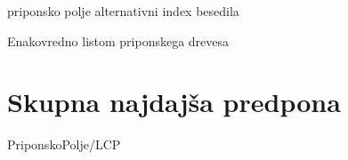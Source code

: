 priponsko polje alternativni index besedila

Enakovredno listom priponskega drevesa

\section{Skupna najdajša predpona}\label{sec:LCP}
{PriponskoPolje/LCP}